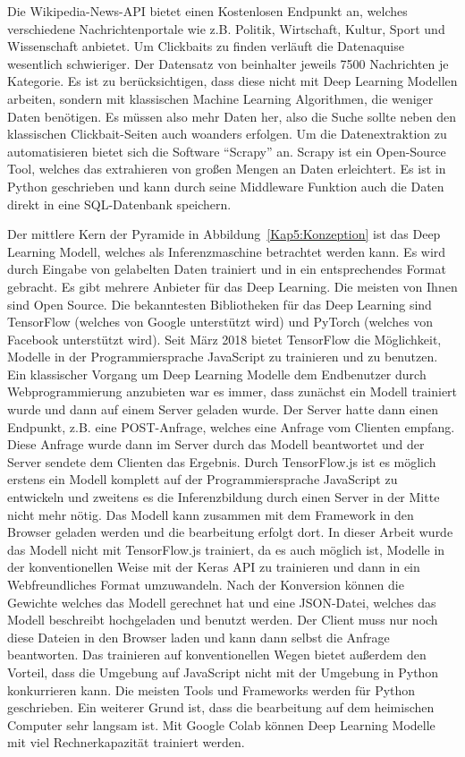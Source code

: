 Die Wikipedia-News-API bietet einen Kostenlosen Endpunkt an, welches verschiedene Nachrichtenportale wie z.B. Politik, Wirtschaft, Kultur, Sport und Wissenschaft anbietet. Um Clickbaits zu finden verläuft die Datenaquise wesentlich schwieriger. Der Datensatz von \cite*{Chakrabortya} beinhalter jeweils 7500 Nachrichten je Kategorie. Es ist zu berücksichtigen, dass diese nicht mit Deep Learning Modellen arbeiten, sondern mit klassischen Machine Learning Algorithmen, die weniger Daten benötigen. Es müssen also mehr Daten her, also die Suche sollte neben den klassischen Clickbait-Seiten auch woanders erfolgen. Um die Datenextraktion zu automatisieren bietet sich die Software \enquote{Scrapy} an. Scrapy ist ein Open-Source Tool, welches das extrahieren von großen Mengen an Daten erleichtert. Es ist in Python geschrieben und kann durch seine Middleware Funktion auch die Daten direkt in eine SQL-Datenbank speichern.

Der mittlere Kern der Pyramide in Abbildung~\ref{Kap5:Konzeption} ist das Deep Learning Modell, welches als Inferenzmaschine betrachtet werden kann. Es wird durch Eingabe von gelabelten Daten trainiert und in ein entsprechendes Format gebracht. Es gibt mehrere Anbieter für das Deep Learning. Die meisten von Ihnen sind Open Source. Die bekanntesten Bibliotheken für das Deep Learning sind TensorFlow (welches von Google unterstützt wird) und PyTorch (welches von Facebook unterstützt wird). Seit März 2018 bietet TensorFlow die Möglichkeit, Modelle in der Programmiersprache JavaScript zu trainieren und zu benutzen. Ein klassischer Vorgang um Deep Learning Modelle dem Endbenutzer durch Webprogrammierung anzubieten war es immer, dass zunächst ein Modell trainiert wurde und dann auf einem Server geladen wurde. Der Server hatte dann einen Endpunkt, z.B. eine POST-Anfrage, welches eine Anfrage vom Clienten empfang. Diese Anfrage wurde dann im Server durch das Modell beantwortet und der Server sendete dem Clienten das Ergebnis. Durch TensorFlow.js ist es möglich erstens ein Modell komplett auf der Programmiersprache JavaScript zu entwickeln und zweitens es die Inferenzbildung durch einen Server in der Mitte nicht mehr nötig. Das Modell kann zusammen mit dem Framework in den Browser geladen werden und die bearbeitung erfolgt dort. In dieser Arbeit wurde das Modell nicht mit TensorFlow.js trainiert, da es auch möglich ist, Modelle in der konventionellen Weise mit der Keras API zu trainieren und dann in ein Webfreundliches Format umzuwandeln. Nach der Konversion können die Gewichte welches das Modell gerechnet hat und eine JSON-Datei, welches das Modell beschreibt hochgeladen und benutzt werden. Der Client muss nur noch diese Dateien in den Browser laden und kann dann selbst die Anfrage beantworten. Das trainieren auf konventionellen Wegen bietet außerdem den Vorteil, dass die Umgebung auf JavaScript nicht mit der Umgebung in Python konkurrieren kann. Die meisten Tools und Frameworks werden für Python geschrieben. Ein weiterer Grund ist, dass die bearbeitung auf dem heimischen Computer sehr langsam ist. Mit Google Colab können Deep Learning Modelle mit viel Rechnerkapazität trainiert werden.

